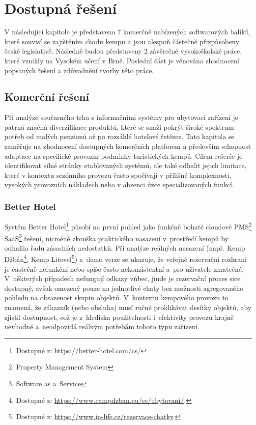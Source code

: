 \chapter{Dostupná řešení}
\label{ch:existing}
V následující kapitole je představeno 7 komerčně nabízených softwarových balíků, které souvisí se zajištěním chodu kempu a jsou alespoň částečně přizpůsobeny české legislativě.
Následně budou představeny 2 závěrečné vysokoškolské práce, které vznikly na Vysokém učení v Brně.
Poslední část je věnována zhodnocení popsaných řešení a zdůvodnění tvorby této práce.

\section{Komerční řešení}
Při analýze současného trhu s informačními systémy pro ubytovací zařízení je patrná značná diverzifikace produktů, které se snaží pokrýt široké spektrum potřeb od malých penzionů až po rozsáhlé hotelové řetězce.
Tato kapitola se zaměřuje na zhodnocení dostupných komerčních platforem a především schopnost adaptace na specifické provozní podmínky turistických kempů.
Cílem rešerše je identifikovat silné stránky etablovaných systémů, ale také odhalit jejich limitace, které v kontextu sezónního provozu často spočívají v přílišné komplexnosti, vysokých provozních nákladech nebo v absenci úzce specializovaných funkcí.

\subsection{Better Hotel}
Systém Better Hotel\footnote{Dostupné z: \url{https://better-hotel.com/cs/}} působí na první pohled jako funkčně bohaté cloudové PMS\footnote{Property Management System} SaaS\footnote{Software as a~Service} řešení, nicméně zkouška praktického nasazení v~prostředí kempů by odhalila řadu zásadních nedostatků.
Při analýze reálných nasazení (např. Kemp Džbán\footnote{Dostupné z: \url{https://www.campdzban.eu/cs/ubytovani/}.}, Kemp Litovel\footnote{Dostupné z: \url{https://www.in-life.cz/rezervace-chatky}.}) a~demo verze se ukazuje, že veřejné rezervační rozhraní je částečně nefunkční nebo spíše často nekonzistentní a~pro uživatele zmatečné.
V~některých případech nefungují odkazy vůbec, jinde je rezervační proces sice dostupný, avšak omezený pouze na jednotlivé chaty bez možnosti agregovaného pohledu na obsazenost skupin objektů.
V~kontextu kempového provozu to znamená, že zákazník (nebo obsluha) musí ručně proklikávat desítky objektů, aby zjistil dostupnost, což je z~hlediska použitelnosti i~efektivity provozu krajně nevhodné a~neodpovídá reálným potřebám tohoto typu zařízení.

